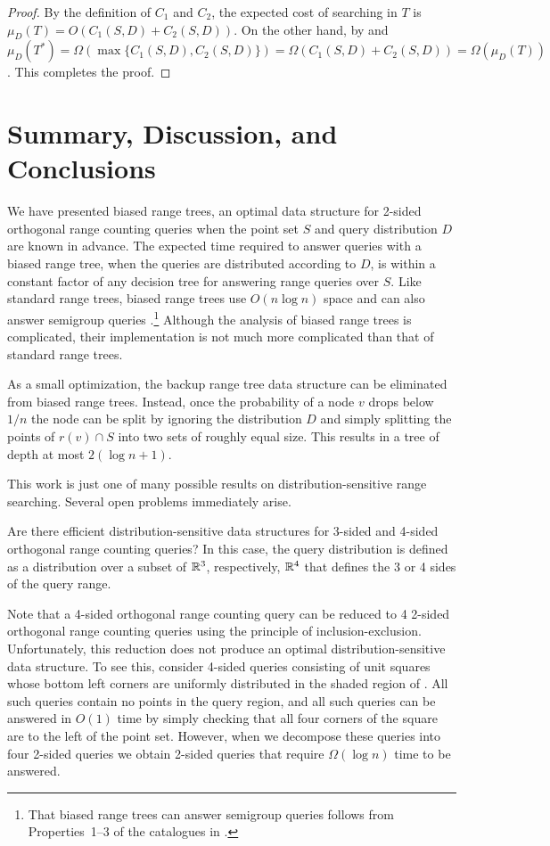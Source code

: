 \documentclass[charterfonts]{patmorin}
\begin{document}
\begin{proof}
By the definition of $C_1$ and $C_2$, the expected cost of searching in
$T$ is $\mu_D(T)=O(C_1(S,D)+C_2(S,D))$.  On the other hand, by
 and  $\mu_D(T^*) =
\Omega(\max\{C_1(S,D),C_2(S,D)\}) =
\Omega(C_1(S,D)+C_2(S,D))=\Omega(\mu_D(T))$.  This completes the proof.
\end{proof}

\section{Summary, Discussion, and Conclusions}

We have presented biased range trees, an optimal data structure for
2-sided orthogonal range counting queries when the point set $S$ and
query distribution $D$ are known in advance. The expected time required
to answer queries with a biased range tree, when the queries are
distributed according to $D$, is within a constant factor of any
decision tree for answering range queries over $S$.  Like standard
range trees, biased range trees use $O(n\log n)$ space and can also
answer semigroup queries \cite{ae133,ae292}.\footnote{That biased
range trees can answer semigroup queries follows
from Properties~1--3 of the catalogues in .}
Although the analysis of
biased range trees is complicated, their implementation is not much
more complicated than that of standard range trees.

As a small optimization, the backup range tree data structure can be
eliminated from biased range trees.  Instead, once the probability of
a node $v$ drops below $1/n$ the node can be split by ignoring the
distribution $D$ and simply splitting the points of $r(v)\cap S$ into
two sets of roughly equal size.  This results in a tree of depth at
most $2(\log n+1)$.

This work is just one of many possible results on
distribution-sensitive range searching.  Several open problems
immediately arise.  

\begin{op}
Are there efficient distribution-sensitive data structures for 3-sided
and 4-sided orthogonal range counting queries?  In this case, the query
distribution is defined as a distribution over a subset of $\mathbb{R}^3$,
respectively, $\mathbb{R}^4$ that defines the 3 or 4 sides of the query range.
\end{op}

Note that a 4-sided orthogonal range counting query can be reduced to 4
2-sided orthogonal range counting queries using the principle of
inclusion-exclusion.  Unfortunately, this reduction does not produce an
optimal distribution-sensitive data structure.  To see this, consider
4-sided queries consisting of unit squares whose bottom left corners are
uniformly distributed in the shaded region of .  All such
queries contain no points in the query region, and all such queries can be
answered in $O(1)$ time by simply checking that all four corners of the
square are to the left of the point set.  However, when we decompose these
queries into four 2-sided queries we obtain 2-sided queries that require
$\Omega(\log n)$ time to be answered.
\end{document}
